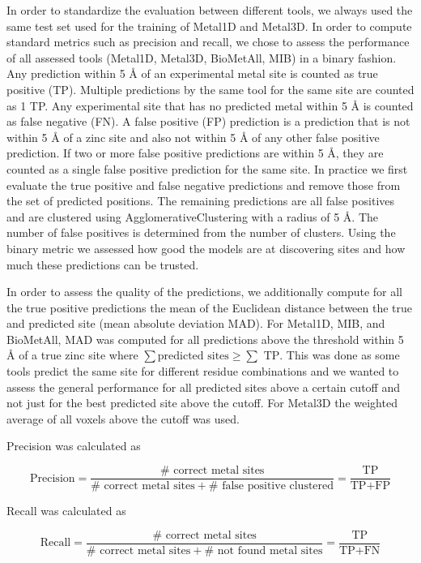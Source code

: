 \documentclass[  ASAPversion,
  ,
  9pt]{elife}
\begin{document}
In order to standardize the evaluation between different tools, we always used the same test set used for the training of Metal1D and Metal3D. In order to compute standard metrics such as precision and recall, we chose to assess the performance of all assessed tools (Metal1D, Metal3D, BioMetAll, MIB) in a binary fashion. Any prediction within 5 Å of an experimental metal site is counted as true positive (TP). Multiple predictions by the same tool for the same site are counted as 1 TP. Any experimental site that has no predicted metal within 5 Å is counted as false negative (FN). A false positive (FP) prediction is a prediction that is not within 5 Å of a zinc site and also not within 5 Å of any other false positive prediction. If two or more false positive predictions are within 5 Å, they are counted as a single false positive prediction for the same site. In practice we first evaluate the true positive and false negative predictions and remove those from the set of predicted positions. The remaining predictions are all false positives and are clustered using AgglomerativeClustering with a radius of 5 Å. The number of false positives is determined from the number of clusters. Using the binary metric we assessed how good the models are at discovering sites and how much these predictions can be trusted.

In order to assess the quality of the predictions, we additionally compute for all the true positive predictions the mean of the Euclidean distance between the true and predicted site (mean absolute deviation MAD). For Metal1D, MIB, and BioMetAll, MAD was computed for all predictions above the threshold within 5 Å of a true zinc site where \(\sum\text{predicted sites} \geq \sum\text{ TP}\). This was done as some tools predict the same site for different residue combinations and we wanted to assess the general performance for all predicted sites above a certain cutoff and not just for the best predicted site above the cutoff. For Metal3D the weighted average of all voxels above the cutoff was used.

Precision was calculated as

\[
\text{Precision} =\frac{\#\text{ correct metal sites}}{\#\text{ correct metal sites} + \#\text{ false positive clustered}} = \frac{\text{TP}}{\text{TP}+\text{FP}}
\]

Recall was calculated as

\[
\text{Recall} =\frac{\#\text{ correct metal sites}}{\#\text{ correct metal sites} + \#\text{ not found metal sites}}  = \frac{\text{TP}}{\text{TP}+\text{FN}}
\]
\end{document}
